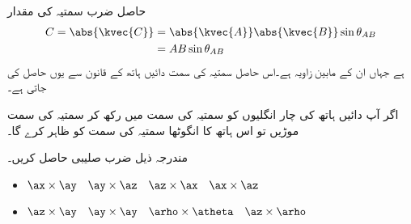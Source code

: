 حاصل ضرب سمتیہ  کی مقدار
\begin{gather}
\begin{aligned}\label{مساوات_بنیادی_ضرب_صلیبی_تعریف}
C=\abs{\kvec{C}} &= \abs {\kvec{A}} \abs{\kvec{B}} \sin \theta_{AB}\\
&=A B \sin \theta_{AB}
\end{aligned}
\end{gather}
ہے جہاں  ان کے مابین زاویہ ہے۔اس حاصل سمتیہ کی سمت دائیں ہاتھ  کے قانون سے یوں حاصل کی جاتی ہے۔ 

اگر آپ دائیں ہاتھ کی چار انگلیوں کو سمتیہ  کی سمت میں رکھ کر  سمتیہ کی سمت موڑیں تو اس ہاتھ کا انگوٹھا   سمتیہ کی سمت کو ظاہر کرے گا۔

مندرجہ ذیل ضرب صلیبی حاصل کریں۔
\begin{itemize}
\item
$\ax \times \ay \quad \ay \times \az \quad \az \times \ax \quad \ax \times \az$ \\
\item
 $\az \times \ay \quad \ay \times \ay \quad \arho \times \atheta \quad \az \times \arho$
\end{itemize}

